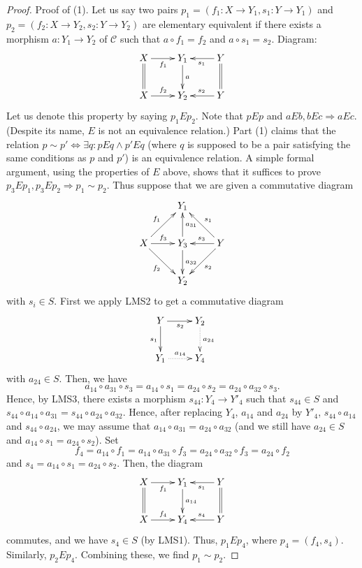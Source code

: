 \begin{proof}
Proof of (1). Let us say two pairs $p_1 = (f_1 : X \to Y_1, s_1 : Y \to Y_1)$
and $p_2 = (f_2 : X \to Y_2, s_2 : Y \to Y_2)$ are elementary equivalent
if there exists a morphism $a : Y_1 \to Y_2$ of $\mathcal{C}$ such that
$a \circ f_1 = f_2$ and $a \circ s_1 = s_2$. Diagram:
$$
\xymatrix{
X \ar@{=}[d] \ar[r]_{f_1} & Y_1 \ar[d]^a & Y \ar[l]^{s_1} \ar@{=}[d] \\
X \ar[r]^{f_2} & Y_2 & Y \ar[l]_{s_2}
}
$$
Let us denote this property by saying $p_1Ep_2$.
Note that $pEp$ and $aEb, bEc \Rightarrow aEc$.
(Despite its name, $E$ is not an equivalence
relation.)
Part (1) claims that the relation
$p \sim p' \Leftrightarrow \exists q: pEq \wedge p'Eq$
(where $q$ is supposed to be a pair satisfying the
same conditions as $p$ and $p'$)
is an equivalence relation. A simple formal argument, using the properties
of $E$ above, shows that it suffices to prove
$p_3Ep_1, p_3Ep_2 \Rightarrow p_1 \sim p_2$.
Thus suppose that we are given a commutative diagram
$$
\xymatrix{
 & Y_1 & \\
X \ar[ru]^{f_1} \ar[r]^{f_3} \ar[rd]_{f_2} &
Y_3 \ar[u]_{a_{31}} \ar[d]^{a_{32}} &
Y \ar[lu]_{s_1} \ar[l]_{s_3} \ar[ld]^{s_2} \\
& Y_2 &
}
$$
with $s_i \in S$.
First we apply LMS2 to get a commutative diagram
$$
\xymatrix{
Y \ar[d]_{s_1} \ar[r]_{s_2} & Y_2 \ar@{..>}[d]^{a_{24}} \\
Y_1 \ar@{..>}[r]^{a_{14}} & Y_4
}
$$
with $a_{24} \in S$. Then, we have
$$
a_{14} \circ a_{31} \circ s_3 =
a_{14} \circ s_1 =
a_{24} \circ s_2 =
a_{24} \circ a_{32} \circ s_3.
$$
Hence, by LMS3, there exists a
morphism $s_{44} : Y_4 \to Y'_4$ such that $s_{44} \in S$ and
$s_{44} \circ a_{14} \circ a_{31}
= s_{44} \circ a_{24} \circ a_{32}$.
Hence, after replacing $Y_4$, $a_{14}$ and $a_{24}$ by $Y'_4$,
$s_{44} \circ a_{14}$ and $s_{44} \circ a_{24}$, we may assume
that $a_{14} \circ a_{31} = a_{24} \circ a_{32}$ (and
we still have $a_{24} \in S$ and
$a_{14} \circ s_1 = a_{24} \circ s_2$). Set
$$
f_4 =
a_{14} \circ f_1 =
a_{14} \circ a_{31} \circ f_3 =
a_{24} \circ a_{32} \circ f_3 =
a_{24} \circ f_2
$$
and
$s_4 = a_{14} \circ s_1 = a_{24} \circ s_2$. Then, the diagram
$$
\xymatrix{
X \ar@{=}[d] \ar[r]_{f_1} & Y_1 \ar[d]^{a_{14}} & Y \ar[l]^{s_1} \ar@{=}[d] \\
X \ar[r]^{f_4} & Y_4 & Y \ar[l]_{s_4}
}
$$
commutes, and we have $s_4 \in S$ (by LMS1). Thus, $p_1 E p_4$,
where $p_4 = (f_4, s_4)$. Similarly, $p_2 E p_4$. Combining these,
we find $p_1 \sim p_2$.


\end{proof}
